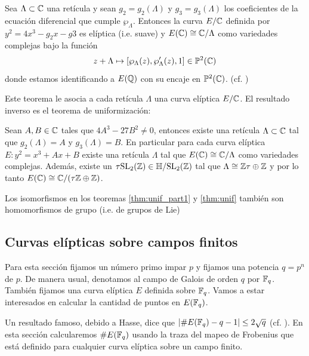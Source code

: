 \begin{thm}\label{thm:unif_part1}
  Sea $\Lambda\subset\mathbb{C}$ una ret\'icula y sean $g_2=g_2(\Lambda)$ y $g_3=g_3(\Lambda)$ los coeficientes
  de la ecuaci\'on diferencial que cumple $\wp_{\Lambda}$. Entonces la curva $E/\mathbb{C}$ definida por
  $y^2=4x^3-g_2x-g3$ es el\'iptica (i.e. suave) y $E(\mathbb{C})\cong\mathbb{C}/\Lambda$ como variedades complejas
  bajo la funci\'on
  \[
    z+\Lambda \mapsto [\wp_{\Lambda}(z),\wp'_{\Lambda}(z),1]\in\mathbb{P}^2(\mathbb{C})
  \]
  donde estamos identificando a $E(\mathbb{Q})$ con su encaje en $\mathbb{P}^2(\mathbb{C})$. (cf.
  \cite[cap\'itulo VI, proposici\'on 3.6]{SilvermanTAOEC})
\end{thm}

Este teorema le asocia a cada ret\'icula $\Lambda$ una curva el\'iptica $E/\mathbb{C}$. El resultado inverso
es el teorema de uniformizaci\'on:

\begin{thm}\label{thm:unif}
  Sean $A,B\in\mathbb{C}$ tales que $4A^3-27B^2\neq0$, entonces existe una ret\'icula $\Lambda\subset\mathbb{C}$ tal
  que $g_2(\Lambda)=A$ y $g_3(\Lambda)=B$. En particular para cada curva el\'iptica $E:y^2=x^3+Ax+B$
  existe una ret\'icula $\Lambda$ tal que $E(\mathbb{C})\cong\mathbb{C}/\Lambda$ como variedades complejas. Además,
  existe un $\tau\mathrm{SL}_2(\mathbb{Z})\in\mathbb{H}/\mathrm{SL}_2(\mathbb{Z})$ tal que $\Lambda\cong\mathbb{Z}\tau\oplus\mathbb{Z}$ y
  por lo tanto $E(\mathbb{C})\cong\mathbb{C}/(\tau\mathbb{Z}\oplus\mathbb{Z})$.
\end{thm}

Los isomorfismos en los teoremas \ref{thm:unif_part1} y \ref{thm:unif} tambi\'en son homomorfismos
de grupo (i.e. de grupos de Lie)





\subsection{Curvas el\'ipticas sobre campos finitos}%

Para esta secci\'on fijamos un n\'umero primo impar $p$ y fijamos una potencia $q=p^n$ de $p$. De manera
usual, denotamos al campo de Galois de orden $q$ por $\mathbb{F}_q$. Tambi\'en fijamos una curva el\'iptica
$E$ definida sobre $\mathbb{F}_q$. Vamos a estar interesados en calcular la cantidad de puntos en $E(\mathbb{F}_q)$.

Un resultado famoso, debido a Hasse, dice que $\left| \# E(\mathbb{F}_q)-q-1 \right|\leq2\sqrt{q}$ (cf.
\cite[cap\'itulo V, teorema 1.1]{SilvermanTAOEC}). En esta secci\'on calcularemos $\# E(\mathbb{F}_q)$
usando la traza del mapeo de Frobenius que est\'a definido para cualquier curva el\'iptica sobre
un campo finito.


